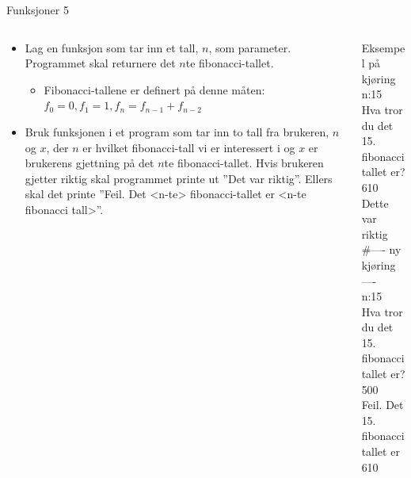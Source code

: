 \documentclass[screen, aspectratio=169]{beamer}
\begin{document}
\begin{frame}{Funksjoner 5}
	\begin{columns}
		\begin{column}{.6\textwidth}
			\begin{itemize}
				\item Lag en funksjon som tar inn et tall, $n$, som parameter. Programmet skal returnere det $n$te fibonacci-tallet.
				\begin{itemize}
					\item Fibonacci-tallene er definert på denne måten: $f_0 = 0, f_1 = 1, f_n = f_{n-1} + f_{n-2}$
				\end{itemize}
				\item Bruk funksjonen i et program som tar inn to tall fra brukeren, $n$ og $x$, der $n$ er hvilket fibonacci-tall vi er interessert i og $x$ er brukerens gjettning på det $n$te fibonacci-tallet. Hvis brukeren gjetter riktig skal programmet printe ut ''Det var riktig''. Ellers skal det printe ''Feil. Det <n-te> fibonacci-tallet er <n-te fibonacci tall>''.
			\end{itemize}
		\end{column}
		\begin{column}{.4\textwidth}
			\begin{exampleblock}{Eksempel på kjøring}
				n:\textcolor{input-color}{15}\\
				Hva tror du det 15. fibonacci tallet er? \textcolor{input-color}{610}\\
				Dette var riktig\\
				\textcolor{comment-color}{\#---- ny kjøring ----}\\
				n:\textcolor{input-color}{15}\\
				Hva tror du det 15. fibonacci tallet er? \textcolor{input-color}{500}\\
				Feil. Det 15. fibonacci tallet er 610
			\end{exampleblock}
		\end{column}
	\end{columns}
\end{frame}
\end{document}

